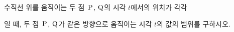 수직선 위를 움직이는 두 점~$\mathrm{P}$, $\mathrm{Q}$의 시각 $t$에서의 위치가 각각 \par\smallskip{}\par\smallskip\noindent 일 때, 두 점~$\mathrm{P}$, $\mathrm{Q}$가 같은 방향으로 움직이는 시각 $t$의 값의 범위를 구하시오.
